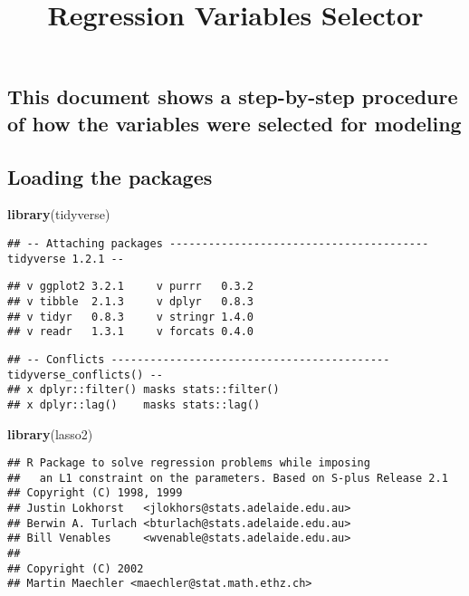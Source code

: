 \documentclass[]{article}
\title{Regression Variables Selector}
\author{}
\date{}
\newenvironment{Shaded}{\begin{snugshade}}{\end{snugshade}}
\newcommand{\KeywordTok}[1]{\textcolor[rgb]{0.13,0.29,0.53}{\textbf{#1}}}
\newcommand{\NormalTok}[1]{#1}
\begin{document}
\maketitle

\hypertarget{this-document-shows-a-step-by-step-procedure-of-how-the-variables-were-selected-for-modeling}{%
\subsection{This document shows a step-by-step procedure of how the
variables were selected for
modeling}\label{this-document-shows-a-step-by-step-procedure-of-how-the-variables-were-selected-for-modeling}}

\hypertarget{loading-the-packages}{%
\subsection{Loading the packages}\label{loading-the-packages}}

\begin{Shaded}
\begin{Highlighting}[]
\KeywordTok{library}\NormalTok{(tidyverse)}
\end{Highlighting}
\end{Shaded}

\begin{verbatim}
## -- Attaching packages ---------------------------------------- tidyverse 1.2.1 --
\end{verbatim}

\begin{verbatim}
## v ggplot2 3.2.1     v purrr   0.3.2
## v tibble  2.1.3     v dplyr   0.8.3
## v tidyr   0.8.3     v stringr 1.4.0
## v readr   1.3.1     v forcats 0.4.0
\end{verbatim}

\begin{verbatim}
## -- Conflicts ------------------------------------------- tidyverse_conflicts() --
## x dplyr::filter() masks stats::filter()
## x dplyr::lag()    masks stats::lag()
\end{verbatim}

\begin{Shaded}
\begin{Highlighting}[]
\KeywordTok{library}\NormalTok{(lasso2)}
\end{Highlighting}
\end{Shaded}

\begin{verbatim}
## R Package to solve regression problems while imposing
##   an L1 constraint on the parameters. Based on S-plus Release 2.1
## Copyright (C) 1998, 1999
## Justin Lokhorst   <jlokhors@stats.adelaide.edu.au>
## Berwin A. Turlach <bturlach@stats.adelaide.edu.au>
## Bill Venables     <wvenable@stats.adelaide.edu.au>
## 
## Copyright (C) 2002
## Martin Maechler <maechler@stat.math.ethz.ch>
\end{verbatim}
\end{document}
